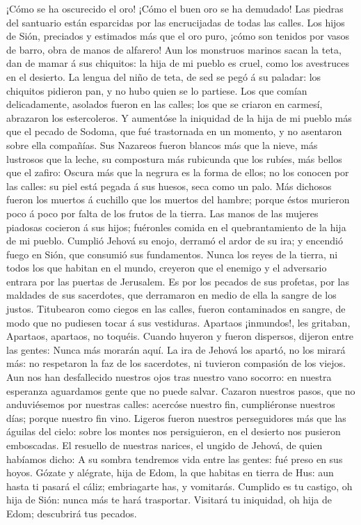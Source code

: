  ¡Cómo se ha oscurecido el oro! ¡Cómo el buen oro se ha
demudado! Las piedras del santuario están esparcidas por las
encrucijadas de todas las calles.  Los hijos de Sión,
preciados y estimados más que el oro puro, ¡cómo son tenidos por vasos
de barro, obra de manos de alfarero!  Aun los monstruos
marinos sacan la teta, dan de mamar á sus chiquitos: la hija de mi
pueblo es cruel, como los avestruces en el desierto.  La
lengua del niño de teta, de sed se pegó á su paladar: los chiquitos
pidieron pan, y no hubo quien se lo partiese.  Los que
comían delicadamente, asolados fueron en las calles; los que se criaron
en carmesí, abrazaron los estercoleros.  Y aumentóse la
iniquidad de la hija de mi pueblo más que el pecado de Sodoma, que fué
trastornada en un momento, y no asentaron sobre ella compañías.
 Sus Nazareos fueron blancos más que la nieve, más
lustrosos que la leche, su compostura más rubicunda que los rubíes, más
bellos que el zafiro:  Oscura más que la negrura es la
forma de ellos; no los conocen por las calles: su piel está pegada á sus
huesos, seca como un palo.  Más dichosos fueron los
muertos á cuchillo que los muertos del hambre; porque éstos murieron
poco á poco por falta de los frutos de la tierra.  Las
manos de las mujeres piadosas cocieron á sus hijos; fuéronles comida en
el quebrantamiento de la hija de mi pueblo.  Cumplió
Jehová su enojo, derramó el ardor de su ira; y encendió fuego en Sión,
que consumió sus fundamentos.  Nunca los reyes de la
tierra, ni todos los que habitan en el mundo, creyeron que el enemigo y
el adversario entrara por las puertas de Jerusalem.  Es
por los pecados de sus profetas, por las maldades de sus sacerdotes, que
derramaron en medio de ella la sangre de los justos. 
Titubearon como ciegos en las calles, fueron contaminados en sangre, de
modo que no pudiesen tocar á sus vestiduras.  Apartaos
¡inmundos!, les gritaban, Apartaos, apartaos, no toquéis. Cuando huyeron
y fueron dispersos, dijeron entre las gentes: Nunca más morarán aquí.
 La ira de Jehová los apartó, no los mirará más: no
respetaron la faz de los sacerdotes, ni tuvieron compasión de los
viejos.  Aun nos han desfallecido nuestros ojos tras
nuestro vano socorro: en nuestra esperanza aguardamos gente que no puede
salvar.  Cazaron nuestros pasos, que no anduviésemos por
nuestras calles: acercóse nuestro fin, cumpliéronse nuestros días;
porque nuestro fin vino.  Ligeros fueron nuestros
perseguidores más que las águilas del cielo: sobre los montes nos
persiguieron, en el desierto nos pusieron emboscadas.  El
resuello de nuestras narices, el ungido de Jehová, de quien habíamos
dicho: A su sombra tendremos vida entre las gentes: fué preso en sus
hoyos.  Gózate y alégrate, hija de Edom, la que habitas
en tierra de Hus: aun hasta ti pasará el cáliz; embriagarte has, y
vomitarás.  Cumplido es tu castigo, oh hija de Sión:
nunca más te hará trasportar. Visitará tu iniquidad, oh hija de Edom;
descubrirá tus pecados.

